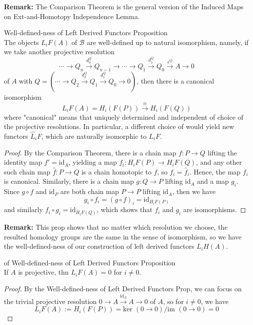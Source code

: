 \noindent\textbf{Remark:} The Comparison Theorem is the general version of the Induced Maps on Ext-and-Homotopy Independence Lemma.

\begin{proposition}{Well-defined-ness of Left Derived Functors Proposition}\\
The objects $L_iF(A)$ of $\mathcal{B}$ are well-defined up to natural isomorphism, namely, if we take another projective resolution
\[
\cdots \to Q_n \xrightarrow{d_n^Q} Q_{n-1} \to \cdots \to Q_1 \xrightarrow{d_1^Q} Q_0 \xrightarrow{\epsilon^Q} A\to0
\]
of $A$ with $Q=(\cdots \to Q_2 \xrightarrow{d_2^Q} Q_1 \xrightarrow{d_1^Q} Q_0\to0)$, then there is a canonical isomorphism
\[
L_i F(A)= H_i (F(P)) \xrightarrow{\cong} H_i(F(Q))
\]
where "canonical" means that uniquely determined and independent of choice of the projective resolutions. In particular, a different choice of would yield new functors $\hat{L}_iF$, which are naturally isomorphic to $L_iF$.
\end{proposition}


\begin{proof}
    By the Comparison Theorem, there is a chain map $f:P\to Q$ lifting the identity map $f'=\text{id}_A$, yielding a map $f_i: H_iF(P) \to H_iF(Q)$, and any other such chain map $\hat{f}: P\to Q$ is a chain homotopic to $f$, so $f_i=\hat{f}_i$. Hence, the map $f_i$ is canonical. Similarly, there is a chain map $g: Q\to P$ lifting $\text{id}_A$ and a map $g_i$. Since $g\circ f$ and $\text{id}_P$ are both chain map $P\to P$ lifting $\text{id}_A$, then we have
    \[
    g_i \circ f_i= (g\circ f)_i =\text{id}_{H_iF(P)}
    \]
    and similarly $f_i \circ g_i= \text{id}_{H_iF(Q)}$, which shows that $f_i$ and $g_i$ are isomorphisms.
\end{proof}

\noindent\textbf{Remark:} This prop shows that no matter which resolution we choose, the resulted homology groups are the same in the sense of isomorphism, so we have the well-defined-ness of our construction of left derived functors $L_iH(A)$.

\begin{corollary}{of Well-defined-ness of Left Derived Functors Proposition}\\
If $A$ is projective, thn $L_iF(A)=0$ for $i\neq 0$.
\end{corollary}

\begin{proof}
    By the Well-defined-ness of Left Derived Functors Prop, we can focus on the trivial projective resolution $0\to A \xrightarrow{\text{id}_A} A\to0$ of $A$, so for $i\neq 0$, we have
    \[
    L_iF(A):= H_i (F(P))= \text{ker }(0\to0)/ \text{im }(0\to0)=0
    \]
\end{proof}


